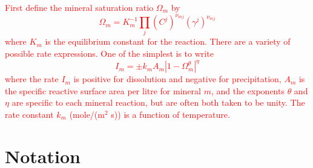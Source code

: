 \documentclass[12pt]{report}
\begin{document}
\textcolor{red}{
First define the mineral saturation ratio $\Omega_{m}$ by
\begin{equation}
  \Omega_{m}=K_{m}^{-1} \prod_{j} (C^{j})^{\nu_{mj}} (\gamma^{j})^{\nu_{mj}}
\end{equation}
where $K_{m}$ is the equilibrium constant for the reaction. There are
a variety of possible rate expressions. One of the simplest is to
write
\begin{equation}
  I_{m} = \pm k_{m} A_{m} |1-\Omega_{m}^{\theta}|^{\eta}
\end{equation}
where the rate $I_{m}$ is positive for dissolution and negative for
precipitation, $A_{m}$ is the specific reactive surface area per litre
for mineral $m$, and the exponents $\theta$ and $\eta$ are specific to
each mineral reaction, but are often both taken to be unity. The rate
constant $k_{m}$ (mole/(m$^{2}$ s)) is a function of temperature.  }

\section{Notation}
\label{ssec.notation}
\end{document}

